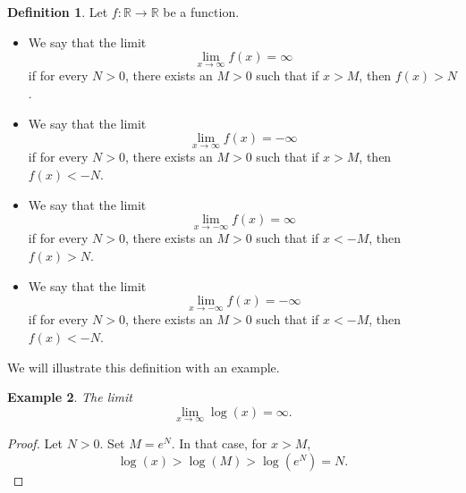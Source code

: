 \documentclass[a4paper, openany]{memoir}
\theoremstyle{definition}
\newtheorem{definition}{Definition}[section]
\theoremstyle{plain}
\newtheorem{example}[definition]{Example}
\begin{document}
\begin{definition}
Let $f: \mathbb{R} \to \mathbb{R}$ be a function. 
\begin{itemize}
    \item We say that the limit
    \[\lim_{x \to \infty} f(x) = \infty\]
    if for every $N > 0$, there exists an $M > 0$ such that if $x > M$, then $f(x) > N$.
    
    \item We say that the limit
    \[\lim_{x \to \infty} f(x) = -\infty\]
    if for every $N > 0$, there exists an $M > 0$ such that if $x > M$, then $f(x) < -N$.
    
    \item We say that the limit
    \[\lim_{x \to -\infty} f(x) = \infty\]
    if for every $N > 0$, there exists an $M > 0$ such that if $x < -M$, then $f(x) > N$.
    
    \item We say that the limit
    \[\lim_{x \to -\infty} f(x) = -\infty\]
    if for every $N > 0$, there exists an $M > 0$ such that if $x < -M$, then $f(x) < -N$.
\end{itemize}
\end{definition}
\noindent We will illustrate this definition with an example.
\begin{example}
The limit
\[\lim_{x \to \infty} \log (x) = \infty.\]
\end{example}
\begin{proof}
Let $N > 0$. Set $M = e^N$. In that case, for $x > M$,
\[\log (x) > \log (M) > \log (e^N) = N.\]
\end{proof}
\end{document}
